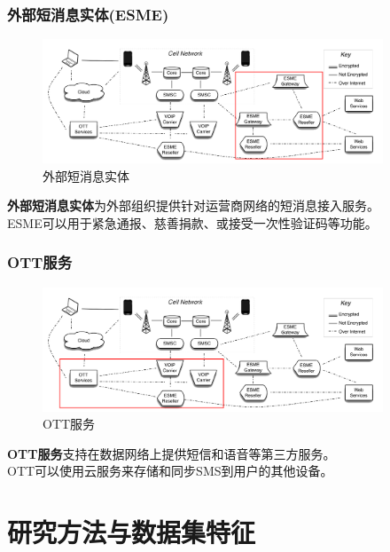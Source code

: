 \documentclass{beamer}
\begin{document}
\begin{frame}
\frametitle{\textbf{外部短消息实体(ESME)}}
\begin{figure}[!t]
\centering
\includegraphics[width=4in]{beamer/figure2.png}
\caption{外部短消息实体}
\label{figure2_ESME}
\end{figure}
\textbf{外部短消息实体}为外部组织提供针对运营商网络的短消息接入服务。\\
ESME可以用于紧急通报、慈善捐款、或接受一次性验证码等功能。
\end{frame}

\begin{frame}
\frametitle{\textbf{OTT服务}}
\begin{figure}[!t]
\centering
\includegraphics[width=4in]{beamer/figure3.png}
\caption{OTT服务}
\label{figure3_OTT}
\end{figure}
\textbf{OTT服务}支持在数据网络上提供短信和语音等第三方服务。\\
OTT可以使用云服务来存储和同步SMS到用户的其他设备。
\end{frame}



\section[方法]{研究方法与数据集特征}
\end{document}
